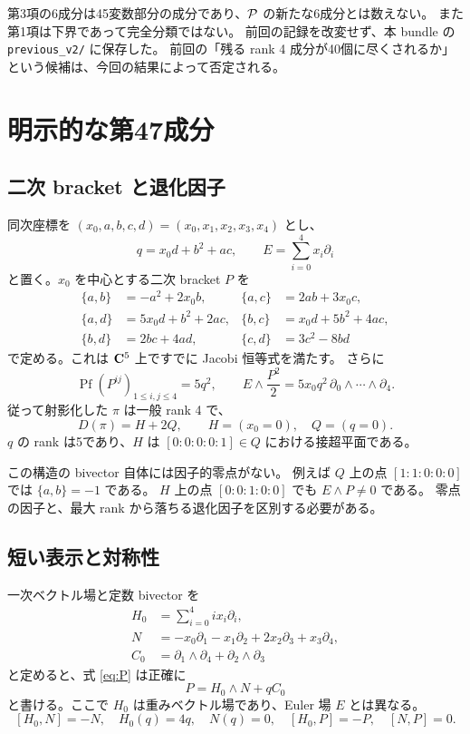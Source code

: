 \documentclass[11pt,a4paper]{ltjsarticle}
\DeclareMathOperator{\Pf}{Pf}\DeclareMathOperator{\PGL}{PGL}\DeclareMathOperator{\GL}{GL}
\theoremstyle{remark}\newtheorem{remark}[theorem]{注意}\renewcommand{\proofname}{証明}
\begin{document}
第3項の6成分は45変数部分の成分であり、$\mathcal P$ の新たな6成分とは数えない。
また第1項は下界であって完全分類ではない。
前回の記録を改変せず、本 bundle の \texttt{previous\_v2/} に保存した。
前回の「残る rank 4 成分が40個に尽くされるか」という候補は、今回の結果によって否定される。

\section{明示的な第47成分}\label{sec:new}
\subsection{二次 bracket と退化因子}
同次座標を $(x_0,a,b,c,d)=(x_0,x_1,x_2,x_3,x_4)$ とし、
\[
 q=x_0d+b^2+ac,\qquad E=\sum_{i=0}^4x_i\partial_i
\]
と置く。$x_0$ を中心とする二次 bracket $P$ を
\begin{align}
 \{a,b\}&=-a^2+2x_0b,&
 \{a,c\}&=2ab+3x_0c,\nonumber\\
 \{a,d\}&=5x_0d+b^2+2ac,&
 \{b,c\}&=x_0d+5b^2+4ac,\label{eq:P}\\
 \{b,d\}&=2bc+4ad,&
 \{c,d\}&=3c^2-8bd\nonumber
\end{align}
で定める。これは $\mathbf C^5$ 上ですでに Jacobi 恒等式を満たす。
さらに
\[
 \Pf(P^{ij})_{1\le i,j\le4}=5q^2,\qquad
 E\wedge\frac{P^2}{2}=5x_0q^2\,\partial_0\wedge\cdots\wedge\partial_4.
\]
従って射影化した $\pi$ は一般 rank 4 で、
\[
 D(\pi)=H+2Q,\qquad H=(x_0=0),\quad Q=(q=0).
\]
$q$ の rank は5であり、$H$ は $[0:0:0:0:1]\in Q$ における接超平面である。

この構造の bivector 自体には因子的零点がない。
例えば $Q$ 上の点 $[1:1:0:0:0]$ では $\{a,b\}=-1$ である。
$H$ 上の点 $[0:0:1:0:0]$ でも $E\wedge P\ne0$ である。
零点の因子と、最大 rank から落ちる退化因子を区別する必要がある。

\subsection{短い表示と対称性}
一次ベクトル場と定数 bivector を
\begin{align*}
 H_0&=\sum_{i=0}^4i x_i\partial_i,\\
 N&=-x_0\partial_1-x_1\partial_2+2x_2\partial_3+x_3\partial_4,\\
 C_0&=\partial_1\wedge\partial_4+\partial_2\wedge\partial_3
\end{align*}
と定めると、式 \eqref{eq:P} は正確に
\begin{equation}\label{eq:compact}
 P=H_0\wedge N+qC_0
\end{equation}
と書ける。ここで $H_0$ は重みベクトル場であり、Euler 場 $E$ とは異なる。
\[
 [H_0,N]=-N,\quad H_0(q)=4q,\quad N(q)=0,\quad
 [H_0,P]=-P,\quad [N,P]=0.
\]
\end{document}
